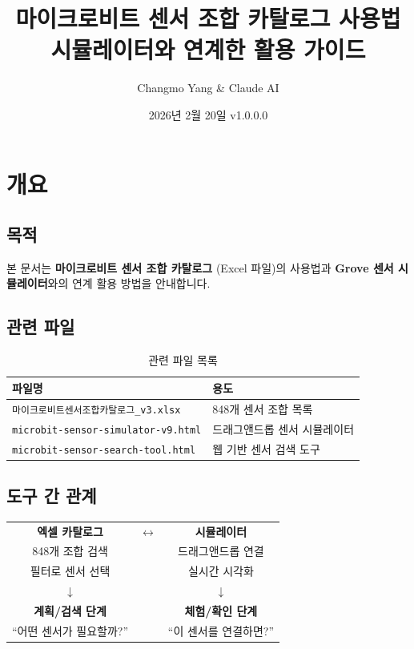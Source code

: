 \documentclass[11pt,a4paper]{article}
\title{마이크로비트 센서 조합 카탈로그 사용법\\[0.5em]
\large 시뮬레이터와 연계한 활용 가이드}
\author{Changmo Yang \& Claude AI}
\date{2026년 2월 20일 \quad v1.0.0.0}
\begin{document}
\maketitle
\tableofcontents
\newpage

\section{개요}

\subsection{목적}

본 문서는 \textbf{마이크로비트 센서 조합 카탈로그} (Excel 파일)의 사용법과 \textbf{Grove 센서 시뮬레이터}와의 연계 활용 방법을 안내합니다.

\subsection{관련 파일}

\begin{table}[H]
\centering
\begin{tabular}{|l|l|}
\hline
\rowcolor{tableheader}
\textbf{파일명} & \textbf{용도} \\
\hline
\texttt{마이크로비트센서조합카탈로그\_v3.xlsx} & 848개 센서 조합 목록 \\
\hline
\texttt{microbit-sensor-simulator-v9.html} & 드래그앤드롭 센서 시뮬레이터 \\
\hline
\texttt{microbit-sensor-search-tool.html} & 웹 기반 센서 검색 도구 \\
\hline
\end{tabular}
\caption{관련 파일 목록}
\end{table}

\subsection{도구 간 관계}

\begin{tcolorbox}[infobox]
\centering
\begin{tabular}{ccc}
\textbf{엑셀 카탈로그} & \Large$\leftrightarrow$ & \textbf{시뮬레이터} \\[0.5em]
848개 조합 검색 & & 드래그앤드롭 연결 \\
필터로 센서 선택 & & 실시간 시각화 \\[1em]
$\downarrow$ & & $\downarrow$ \\[0.5em]
\textbf{계획/검색 단계} & & \textbf{체험/확인 단계} \\
``어떤 센서가 필요할까?'' & & ``이 센서를 연결하면?'' \\
\end{tabular}
\end{tcolorbox}
\end{document}
